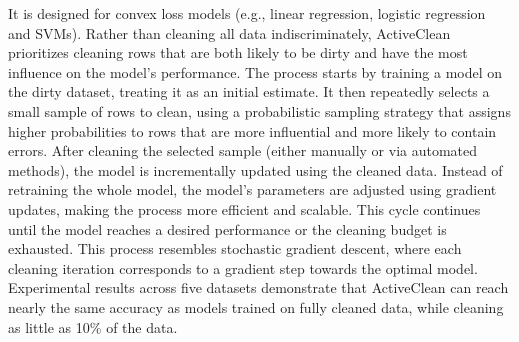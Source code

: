 It is designed for convex loss models (e.g., linear regression, logistic regression and SVMs). 
Rather than cleaning all data indiscriminately, ActiveClean prioritizes cleaning rows that are both likely to be dirty and have the most influence on the model's performance. 
The process starts by training a model on the dirty dataset, treating it as an initial estimate. 
It then repeatedly selects a small sample of rows to clean, using a probabilistic sampling strategy that assigns higher probabilities to rows that are more influential and more likely to contain errors. 
After cleaning the selected sample (either manually or via automated methods), the model is incrementally updated using the cleaned data. 
Instead of retraining the whole model, the model's parameters are adjusted using gradient updates, making the process more efficient and scalable. 
This cycle continues until the model reaches a desired performance or the cleaning budget is exhausted. 
This process resembles stochastic gradient descent, where each cleaning iteration corresponds to a gradient step towards the optimal model. 
Experimental results across five datasets demonstrate that ActiveClean can reach nearly the same accuracy as models trained on fully cleaned data, while cleaning as little as 10\% of the data. 

